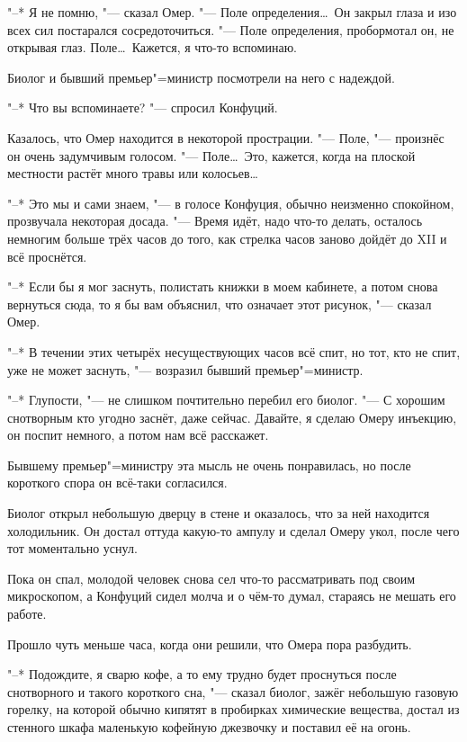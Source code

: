 "--* Я не помню, "--- сказал Омер.
"--- Поле определения\ldots\
Он закрыл глаза и изо всех сил постарался сосредоточиться.
"--- Поле определения, пробормотал он, не открывая глаз.
Поле\ldots\
Кажется, я что-то вспоминаю.

Биолог и бывший премьер"=министр посмотрели на него с надеждой.

"--* Что вы вспоминаете? "--- спросил Конфуций.

Казалось, что Омер находится в некоторой прострации.
"--- Поле, "--- произнёс он очень задумчивым голосом.
"--- Поле\ldots\
Это, кажется, когда на плоской местности растёт много травы или колосьев\ldots

"--* Это мы и сами знаем, "--- в голосе Конфуция, обычно неизменно спокойном,
прозвучала некоторая досада.
"--- Время идёт, надо что-то делать, осталось немногим больше трёх часов до того,
как стрелка часов заново дойдёт до XII и всё проснётся.

"--* Если бы я мог заснуть, полистать книжки в моем кабинете, а потом снова
вернуться сюда, то я бы вам объяснил, что означает этот рисунок, "--- сказал
Омер.

"--* В течении этих четырёх несуществующих часов всё спит, но тот, кто не спит,
уже не может заснуть, "--- возразил бывший премьер"=министр.

"--* Глупости, "--- не слишком почтительно перебил его биолог.
"--- С хорошим снотворным кто угодно заснёт, даже сейчас.
Давайте, я сделаю Омеру инъекцию, он поспит немного, а потом нам всё расскажет.

Бывшему премьер"=министру эта мысль не очень понравилась, но после короткого
спора он всё-таки согласился.

Биолог открыл небольшую дверцу в стене и оказалось, что за ней находится
холодильник.
Он достал оттуда какую-то ампулу и сделал Омеру укол, после чего тот моментально
уснул.

Пока он спал, молодой человек снова сел что-то рассматривать под своим
микроскопом, а Конфуций сидел молча и о чём-то думал, стараясь не мешать его
работе.

Прошло чуть меньше часа, когда они решили, что Омера пора разбудить.

"--* Подождите, я сварю кофе, а то ему трудно будет проснуться после
снотворного и такого короткого сна, "--- сказал биолог, зажёг небольшую
газовую горелку, на которой обычно кипятят в пробирках химические вещества,
достал из стенного шкафа маленькую кофейную джезвочку и поставил её на огонь.

